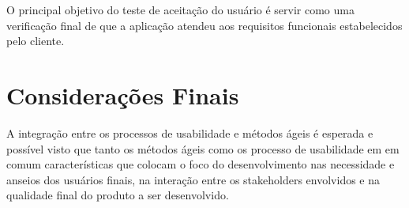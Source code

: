 	O principal objetivo do teste de aceitação do usuário é servir como uma verificação final de que a aplicação atendeu aos requisitos funcionais estabelecidos pelo cliente. 



\section{Considerações Finais}

	A integração entre os processos de usabilidade e métodos ágeis é esperada e possível visto que tanto os métodos ágeis como os processo de usabilidade em em comum características que colocam o foco do desenvolvimento nas necessidade e anseios dos usuários finais, na interação entre os stakeholders envolvidos e na qualidade final do produto a ser desenvolvido.






